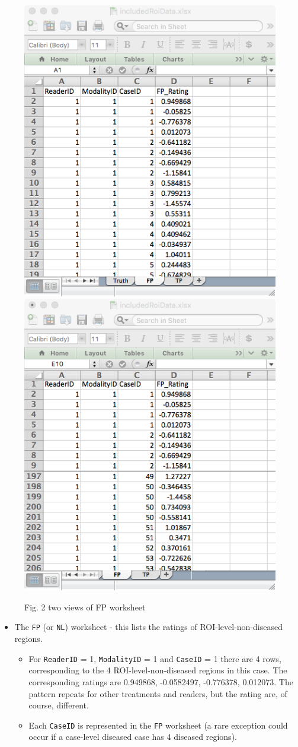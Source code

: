 \documentclass[
]{book}
\providecommand{\tightlist}{%
  \setlength{\itemsep}{0pt}\setlength{\parskip}{0pt}}
\begin{document}
\begin{figure}

{\centering \includegraphics[width=0.5\linewidth,height=0.2\textheight]{images/ROI-FP-1} \includegraphics[width=0.5\linewidth,height=0.2\textheight]{images/ROI-FP-2} 

}

\caption{Fig. 2 two views of FP worksheet}\label{fig:unnamed-chunk-4}
\end{figure}

\begin{itemize}
\tightlist
\item
  The \texttt{FP} (or \texttt{NL}) worksheet - this lists the ratings of ROI-level-non-diseased regions.

  \begin{itemize}
  \tightlist
  \item
    For \texttt{ReaderID} = 1, \texttt{ModalityID} = 1 and \texttt{CaseID} = 1 there are 4 rows, corresponding to the 4 ROI-level-non-diseased regions in this case. The corresponding ratings are 0.949868, -0.0582497, -0.776378, 0.012073. The pattern repeats for other treatments and readers, but the rating are, of course, different.\\
  \item
    Each \texttt{CaseID} is represented in the \texttt{FP} worksheet (a rare exception could occur if a case-level diseased case has 4 diseased regions).
  \end{itemize}
\end{itemize}
\end{document}
